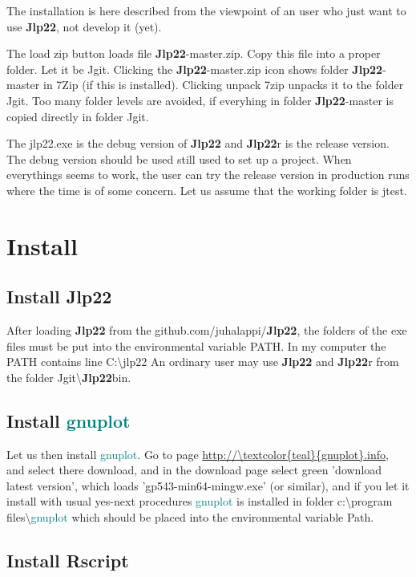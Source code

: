 The installation is here described from the viewpoint of an user 
who just want to use \textbf{Jlp22}, not develop it (yet). 
 
The load zip button loads file \textbf{Jlp22}-master.zip. Copy this file into a proper folder. 
Let it be Jgit. Clicking the \textbf{Jlp22}-master.zip icon shows folder \textbf{Jlp22}-master in 
7Zip (if this is installed). Clicking unpack 7zip unpacks it to the folder Jgit. 
Too many folder levels are avoided, if everyhing in folder \textbf{Jlp22}-master 
is copied directly in 
folder Jgit. 
 
The jlp22.exe is the debug version of \textbf{Jlp22} and \textbf{Jlp22}r is the release version. 
The debug version should be 
used still used to set up a project. When everythings seems to work, the user 
can try the release version in production runs where the time is of some concern. 
Let us assume that the working folder is jtest. 
\section{Install} 
\label{install} 
\subsection{Install \textbf{Jlp22}} 
\label{installjlp22} 
After loading \textbf{Jlp22} from the github.com/juhalappi/\textbf{Jlp22}, the folders of the exe files must be 
put into the environmental variable PATH. In my computer the PATH contains line C:\textbackslash jlp22 
An ordinary user may use \textbf{Jlp22} and \textbf{Jlp22}r from the folder 
Jgit\textbackslash \textbf{Jlp22}bin. 
\subsection{Install \textcolor{teal}{gnuplot}} 
\label{installgnuplot} 
Let us then install \textcolor{teal}{gnuplot}. Go to page \url{http://\textcolor{teal}{gnuplot}.info}, and select there download, 
and in the download page select green 'download latest version', which loads 
'gp543-min64-mingw.exe' (or similar), and if you let it install with usual yes-next procedures 
\textcolor{teal}{gnuplot} is installed  in folder c:\textbackslash program files\textbackslash \textcolor{teal}{gnuplot} 
which should be placed into the environmental variable Path. 
\subsection{Install Rscript} 
\label{installrscript} 
 
